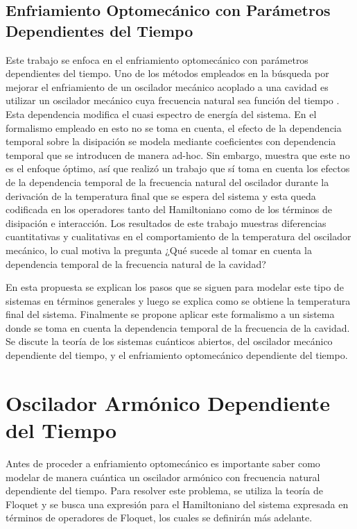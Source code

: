 \documentclass[10pt,a4paper]{report}
\begin{document}
\section{Enfriamiento Optomecánico con Parámetros Dependientes del Tiempo}

Este trabajo se enfoca en el enfriamiento optomecánico con parámetros
dependientes del tiempo. Uno de los métodos empleados en la búsqueda
por mejorar el enfriamiento de un oscilador mecánico acoplado a una
cavidad es utilizar un oscilador mecánico cuya frecuencia natural sea
función del tiempo \cite{BarberisLC}. Esta dependencia modifica el
cuasi espectro de energía del sistema\cite{HanngiFM}. En el formalismo
empleado en \cite{BarberisLC} esto no se toma en cuenta, el efecto de la dependencia temporal sobre la disipación se modela mediante coeficientes con dependencia temporal que se introducen de manera ad-hoc.  Sin embargo, \cite{HanngiFM} muestra que este no es el enfoque óptimo, así que
realizó un trabajo que sí toma en cuenta los efectos de la dependencia
temporal de la frecuencia natural del oscilador durante la derivación
de la temperatura final que se espera del sistema \cite{YanesOC} y esta queda codificada en los operadores tanto del Hamiltoniano como de los términos de disipación e interacción. Los
resultados de este trabajo muestras diferencias cuantitativas y
cualitativas en el comportamiento de la temperatura del oscilador
mecánico, lo cual motiva la pregunta ¿Qué sucede al tomar en cuenta la
dependencia temporal de la frecuencia natural de la cavidad?

En esta propuesta se explican los pasos que se siguen para modelar
este tipo de sistemas en términos generales y luego se explica como se
obtiene la temperatura final del sistema. Finalmente se propone
aplicar este formalismo a un sistema donde se toma en cuenta la
dependencia temporal de la frecuencia de la cavidad. Se
discute la teoría de los sistemas cuánticos abiertos, del oscilador
mecánico dependiente del tiempo, y el enfriamiento optomecánico
dependiente del tiempo.




\chapter{Oscilador Armónico Dependiente del Tiempo}

Antes de proceder a enfriamiento optomecánico es importante saber como
modelar de manera cuántica un oscilador armónico con frecuencia
natural dependiente del tiempo. Para resolver este problema, se
utiliza la teoría de Floquet \cite{WardFT} y se busca una expresión
para el Hamiltoniano del sistema expresada en términos de operadores
de Floquet, los cuales se definirán más adelante.
\end{document}
